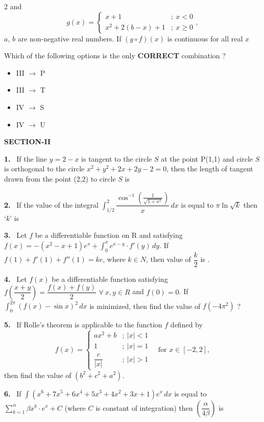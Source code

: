 \documentclass[10pt]{extarticle}
\newcommand{\sect}[1]{\par\smallskip\noindent\textbf{#1}\par}
\newcommand{\qn}[1]{\par\smallskip\noindent\textbf{#1.}~}
\newenvironment{qoptions}{\begin{itemize}[leftmargin=1.8em,itemsep=1pt,topsep=2pt,label={}]}{\end{itemize}}
\newcommand{\opt}[2]{\item[(#1)] #2}
\begin{document}
\begin{multicols}{2}
and
\[g(x)=\begin{cases}x+1 & ;\ x<0\\ x^2+2(b-x)+1 & ;\ x\ge0\end{cases},\]
$a$, $b$ are non-negative real numbers. If $(g\circ f)(x)$ is continuous for all real $x$\par
\smallskip
{}\par
\smallskip
Which of the following options is the only \textbf{CORRECT} combination ?
\begin{qoptions}
\opt{A}{III $\to$ P}
\opt{B}{III $\to$ T}
\opt{C}{IV $\to$ S}
\opt{D}{IV $\to$ U}
\end{qoptions}
\sect{SECTION-II}
\qn{1} If the line $y=2-x$ is tangent to the circle $S$ at the point P(1,1) and circle $S$ is orthogonal to the circle $x^2+y^2+2x+2y-2=0$, then the length of tangent drawn from the point (2,2) to circle $S$ is
\qn{2} If the value of the integral $\displaystyle\int_{1/2}^{2}\dfrac{\cos^{-1}\left(\frac{1}{\sqrt{1+x^2}}\right)}{x}\,dx$ is equal to $\pi\ln\sqrt k$ then `$k$' is
\qn{3} Let $f$ be a differentiable function on R and satisfying $f(x)=-(x^2-x+1)e^x+\displaystyle\int_0^xe^{x-y}\cdot f'(y)\,dy$. If $f(1)+f'(1)+f''(1)=ke$, where $k\in N$, then value of $\dfrac k2$ is \underline{\hspace{1.5cm}}.
\qn{4} Let $f(x)$ be a differentiable function satisfying $f\left(\dfrac{x+y}{2}\right)=\dfrac{f(x)+f(y)}{2}$ $\forall\ x,y\in R$ and $f(0)=0$. If $\displaystyle\int_0^{2\pi}(f(x)-\sin x)^2\,dx$ is minimized, then find the value of $f(-4\pi^2)$ ?
\qn{5} If Rolle's theorem is applicable to the function $f$ defined by
\[f(x)=\begin{cases}ax^2+b & ;\ |x|<1\\ 1 & ;\ |x|=1\\ \dfrac{c}{|x|} & ;\ |x|>1\end{cases}\quad\text{for }x\in[-2,2],\]
then find the value of $(b^2+c^2+a^2)$.
\qn{6} If $\displaystyle\int(x^6+7x^5+6x^4+5x^3+4x^2+3x+1)e^x\,dx$ is equal to $\displaystyle\sum_{k=1}^{\alpha}\beta x^k\cdot e^x+C$ (where $C$ is constant of integration) then $\left(\dfrac{\alpha}{4\beta}\right)$ is
\end{multicols}
\end{document}
